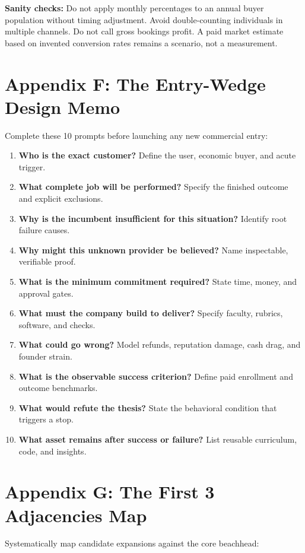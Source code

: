 \textbf{Sanity checks:} Do not apply monthly percentages to an annual buyer population without timing adjustment. Avoid double-counting individuals in multiple channels. Do not call gross bookings profit. A paid market estimate based on invented conversion rates remains a scenario, not a measurement.

\section*{Appendix F: The Entry-Wedge Design Memo}

Complete these 10 prompts before launching any new commercial entry:

\begin{enumerate}
    \item \textbf{Who is the exact customer?} Define the user, economic buyer, and acute trigger.
    \item \textbf{What complete job will be performed?} Specify the finished outcome and explicit exclusions.
    \item \textbf{Why is the incumbent insufficient for this situation?} Identify root failure causes.
    \item \textbf{Why might this unknown provider be believed?} Name inspectable, verifiable proof.
    \item \textbf{What is the minimum commitment required?} State time, money, and approval gates.
    \item \textbf{What must the company build to deliver?} Specify faculty, rubrics, software, and checks.
    \item \textbf{What could go wrong?} Model refunds, reputation damage, cash drag, and founder strain.
    \item \textbf{What is the observable success criterion?} Define paid enrollment and outcome benchmarks.
    \item \textbf{What would refute the thesis?} State the behavioral condition that triggers a stop.
    \item \textbf{What asset remains after success or failure?} List reusable curriculum, code, and insights.
\end{enumerate}

\section*{Appendix G: The First 3 Adjacencies Map}

Systematically map candidate expansions against the core beachhead:

